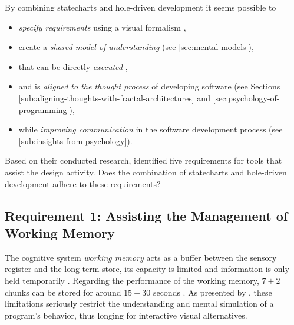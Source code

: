 By combining statecharts and hole-driven development it seems possible to
\begin{itemize}
    \item \emph{specify requirements} using a visual formalism \autocite{leveson_experiences_1991},
    \item create a \emph{shared model of understanding} (see \cref{sec:mental-models}),
    \item that can be directly \emph{executed} \autocite{harel_statecharts:_1987},
    \item and is \emph{aligned to the thought process} of developing software (see Sections \ref{sub:aligning-thoughts-with-fractal-architectures} and \ref{sec:psychology-of-programming}),
    \item while \emph{improving communication} in the software development process (see \cref{sub:insights-from-psychology}).
\end{itemize}
Based on their conducted research, \textcite{visser_expert_1990} identified five requirements for tools that assist the design activity.
Does the combination of statecharts and hole-driven development adhere to these requirements?



\subsection{Requirement 1: Assisting the Management of Working Memory}
The cognitive system \emph{working memory} acts as a buffer between the sensory register and the long-term store, its capacity is limited and information is only held temporarily \autocite{herczeg_software-ergonomie_2018}.
Regarding the performance of the working memory, $7 \pm 2$ chunks can be stored for around $15-30$ seconds \autocite{herczeg_software-ergonomie_2018}.
As presented by \textcite{victor_inventing_2012}, these limitations seriously restrict the understanding and mental simulation of a program's behavior, thus longing for interactive visual alternatives.

